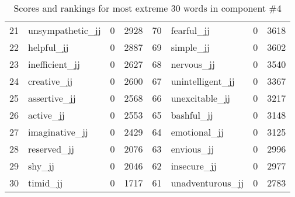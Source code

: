 \begin{table}[tbp]
\begin{tabular}{| rlr@{.}l | rlr@{.}l |}
    21 & unsympathetic\_jj & 0 & 2928    &    70 & fearful\_jj & 0 & 3618 \\
    22 & helpful\_jj & 0 & 2887    &    69 & simple\_jj & 0 & 3602 \\
    23 & inefficient\_jj & 0 & 2627    &    68 & nervous\_jj & 0 & 3540 \\
    24 & creative\_jj & 0 & 2600    &    67 & unintelligent\_jj & 0 & 3367 \\
    25 & assertive\_jj & 0 & 2568    &    66 & unexcitable\_jj & 0 & 3217 \\
    26 & active\_jj & 0 & 2553    &    65 & bashful\_jj & 0 & 3148 \\
    27 & imaginative\_jj & 0 & 2429    &    64 & emotional\_jj & 0 & 3125 \\
    28 & reserved\_jj & 0 & 2076    &    63 & envious\_jj & 0 & 2996 \\
    29 & shy\_jj & 0 & 2046    &    62 & insecure\_jj & 0 & 2977 \\
    30 & timid\_jj & 0 & 1717    &    61 & unadventurous\_jj & 0 & 2783 \\
    \hline
    \end{tabular}
    \caption{Scores and rankings for most extreme 30 words in component \#4} 
\end{table}
\clearpage
